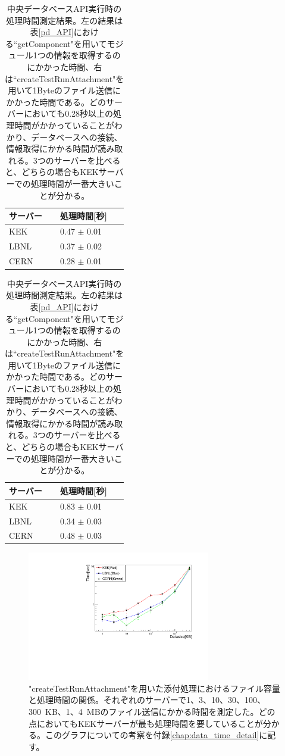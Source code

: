 \begin{table}[tbp]
  \caption[中央データベースAPI実行時の処理時間測定結果。]{中央データベースAPI実行時の処理時間測定結果。左の結果は表\ref{pd_API}における``getComponent"を用いてモジュール1つの情報を取得するのにかかった時間、右は``createTestRunAttachment"を用いて1Byteのファイル送信にかかった時間である。どのサーバーにおいても0.28秒以上の処理時間がかかっていることがわかり、データベースへの接続、情報取得にかかる時間が読み取れる。3つのサーバーを比べると、どちらの場合もKEKサーバーでの処理時間が一番大きいことが分かる。}
  \label{use_prodDB_API}
  \begin{minipage}[t]{.45\textwidth}
  \begin{center}
    \begin{tabular}{|ll|} \hline
      サーバー & 処理時間[秒] \\ \hline
      KEK & 0.47 $\pm$ 0.01 \\ 
      LBNL & 0.37 $\pm$ 0.02 \\ 
      CERN & 0.28 $\pm$ 0.01 \\ \hline 
    \end{tabular}
  \end{center}
  \end{minipage}
  \hfill 
  \begin{minipage}[t]{.45\textwidth}
  \begin{center}
    \begin{tabular}{|ll|} \hline
      サーバー & 処理時間[秒] \\ \hline
      KEK & 0.83 $\pm$ 0.01 \\ 
      LBNL & 0.34 $\pm$ 0.03 \\ 
      CERN & 0.48 $\pm$ 0.03 \\ \hline 
    \end{tabular}
  \end{center}
  \end{minipage}
\end{table}

\begin{figure}[bpt]\centering
  \begin{center}
    \includegraphics[width=8cm,angle=270]{./datasize_vs_time_new.pdf}
  \caption["createTestRunAttachment"を用いた添付処理におけるファイル容量と処理時間の関係]{"createTestRunAttachment"を用いた添付処理におけるファイル容量と処理時間の関係。それぞれのサーバーで1、3、10、30、100、300~KB、1、4~MBのファイル送信にかかる時間を測定した。どの点においてもKEKサーバーが最も処理時間を要していることが分かる。このグラフについての考察を付録\ref{chap:data_time_detail}に記す。}
  \label{datasize_vs_time}
  \end{center}
\end{figure}

